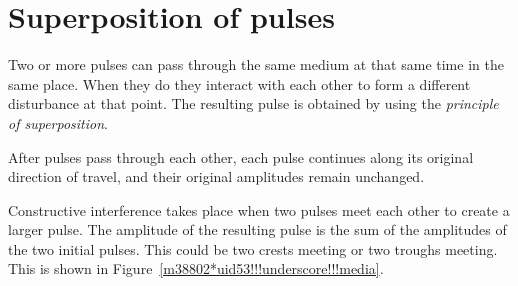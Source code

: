          \section{Superposition of pulses}
    \nopagebreak
\label{m38802*fs-id1166232432154}
{}
      \label{m38802*id316136}Two or more pulses can pass through the same medium at that same time in the same place. When they do they interact with each other to form a different disturbance at that point. The resulting pulse is obtained by using the \textsl{principle of superposition}. 

After pulses pass through each other, each pulse continues along its original direction of travel, and their original amplitudes remain unchanged.\par 
      \label{m38802*id316148}Constructive interference takes place when two pulses meet each other to create a larger pulse. The amplitude of the resulting pulse is the sum of the amplitudes of the two initial pulses. This could be two crests meeting or two troughs meeting. This is shown in Figure~\ref{m38802*uid53!!!underscore!!!media}.\par 


